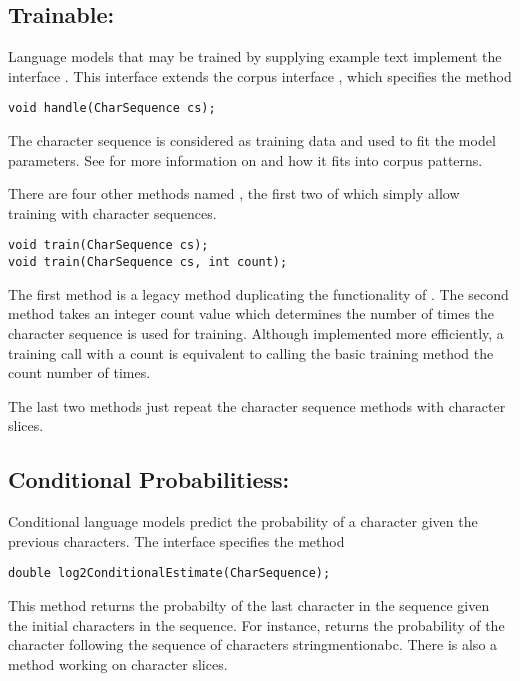 \subsection{Trainable: }

Language models that may be trained by supplying example text
implement the interface .  This interface
extends the corpus interface ,
which specifies the method
%
\begin{verbatim}
void handle(CharSequence cs);
\end{verbatim}
%
The character sequence is considered as training data and used to fit
the model parameters.  See  for more
information on  and how it fits into corpus
patterns.

There are four other methods named , the first two
of which simply allow training with character sequences.
%
\begin{verbatim}
void train(CharSequence cs);
void train(CharSequence cs, int count);
\end{verbatim}
%
The first method is a legacy method duplicating the functionality of
.  The second method takes an integer count value which
determines the number of times the character sequence is used for
training.  Although implemented more efficiently, a training call
with a count is equivalent to calling the basic training method the
count number of times.

The last two methods just repeat the character sequence methods
with character slices.


\subsection{Conditional Probabilitiess: }

Conditional language models predict the probability of a character
given the previous characters.  The interface
 specifies the method
%
\begin{verbatim}
double log2ConditionalEstimate(CharSequence);
\end{verbatim}
%
This method returns the probabilty of the last character in
the sequence given the initial characters in the sequence.  For
instance,  returns the
probability of the character  following the
sequence of characters stringmention{abc}.  There is also
a method working on character slices.


